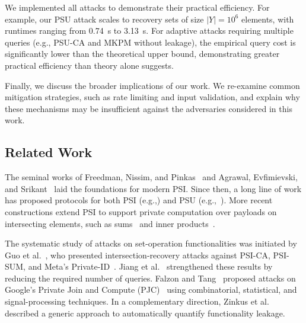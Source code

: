We implemented all attacks to demonstrate their practical efficiency. For example, our PSU attack scales to recovery sets of size $|Y| = 10^6$ elements, with runtimes ranging from \SI{0.74}{\second} to \SI{3.13}{\second}.
For adaptive attacks requiring multiple queries (e.g., PSU-CA and MKPM without leakage), the empirical query cost is significantly lower than the theoretical upper bound, demonstrating greater practical efficiency than theory alone suggests.

Finally, we discuss the broader implications of our work. We re-examine common mitigation strategies, such as rate limiting and input validation, and explain why these mechanisms may be insufficient against the adversaries considered in this work. 


\subsection{Related Work}\label{sec:related-work}



The seminal works of Freedman, Nissim, and Pinkas~\cite{EC:FreNisPin04} and Agrawal, Evfimievski, and Srikant~\cite{SIGMOD:AgrEvfSri03} laid the foundations for modern PSI. Since then, a long line of work has proposed protocols for both PSI (e.g.,\cite{C:PRTY19,USENIX:PinSchZoh14, CCS:CheLaiRin17, CCS:DonCheWen13, FC:DeCTsu10, ASIACCS:Kerschbaum12, CCS:RosTri21, C:ChaMia20}) and PSU (e.g.,~\cite{USENIX:DZBC25,USENIX:TBZCC25,USENIX:JSZG24,USENIX:ZCLZL23,USENIX:JSZDG22,CCS:GNBT25,CCS:ZCLPHW24,CCS:TCLZ23}). More recent constructions extend PSI to support private computation over payloads on intersecting elements, such as sums~\cite{EUROSP:IKNPSSRSY20} and inner products~\cite{ASIACCS:CHIKT23,AC:LPRST21}.

The systematic study of attacks on set-operation functionalities was initiated by Guo et al.~\cite{USENIX:GHLWJL22}, who presented intersection-recovery attacks against PSI-CA, PSI-SUM, and Meta’s Private-ID~\cite{PMC}. Jiang et al.~\cite{NDSS:JiaDuYan24} strengthened these results by reducing the required number of queries. Falzon and Tang~\cite{USENIX:FalTan25} proposed attacks on Google’s Private Join and Compute (PJC)~\cite{AC:LPRST21} using combinatorial, statistical, and signal-processing techniques. In a complementary direction, Zinkus et al.~\cite{USENIX:ZinCaoGre23} described a generic approach to automatically quantify functionality leakage.

